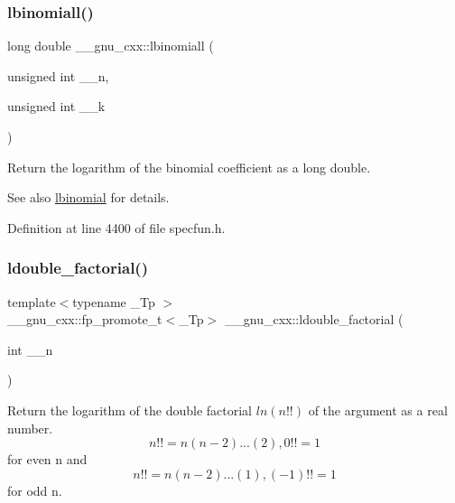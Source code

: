 \subsubsection{\texorpdfstring{lbinomiall()}{lbinomiall()}}
{\footnotesize\ttfamily long double \+\_\+\+\_\+gnu\+\_\+cxx\+::lbinomiall (\begin{DoxyParamCaption}\item[{unsigned int}]{\+\_\+\+\_\+n,  }\item[{unsigned int}]{\+\_\+\+\_\+k }\end{DoxyParamCaption})\hspace{0.3cm}{\ttfamily [inline]}}

Return the logarithm of the binomial coefficient as a {\ttfamily long double}.

\begin{DoxySeeAlso}{See also}
\hyperlink{group__mathsf__gnu_gabfa5aeba56edfa110846fc8e76963bc2}{lbinomial} for details. 
\end{DoxySeeAlso}


Definition at line 4400 of file specfun.\+h.

\mbox{\label{group__mathsf__gnu_ga43bf9a20282d5b9237bf352682a48395}} 
\subsubsection{\texorpdfstring{ldouble\+\_\+factorial()}{ldouble\_factorial()}}
{\footnotesize\ttfamily template$<$typename \+\_\+\+Tp $>$ \\
\+\_\+\+\_\+gnu\+\_\+cxx\+::fp\+\_\+promote\+\_\+t$<$\+\_\+\+Tp$>$ \+\_\+\+\_\+gnu\+\_\+cxx\+::ldouble\+\_\+factorial (\begin{DoxyParamCaption}\item[{int}]{\+\_\+\+\_\+n }\end{DoxyParamCaption})\hspace{0.3cm}{\ttfamily [inline]}}



Return the logarithm of the double factorial $ ln(n!!) $ of the argument as a real number. \[ n!! = n(n-2)...(2), 0!! = 1 \] for even {\ttfamily n} and \[ n!! = n(n-2)...(1), (-1)!! = 1 \] for odd {\ttfamily n}. 



